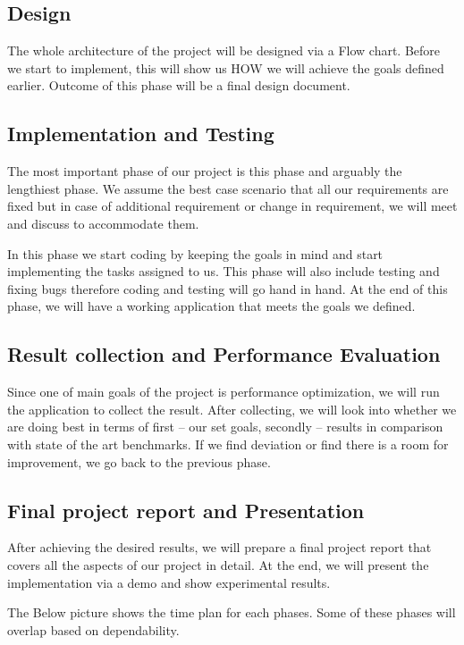 \documentclass[titlepage]{report}
\begin{document}
\subsection{Design}
The whole architecture of the project will be designed via a Flow chart. Before we start to implement, this will show us HOW we will achieve the goals defined earlier. Outcome of this phase will be a final design document. 

\subsection{Implementation and Testing}
The most important phase of our project is this phase and arguably the lengthiest phase. We assume the best case scenario that all our requirements are fixed but in case of additional requirement or change in requirement, we will meet and discuss to accommodate them. 

In this phase we start coding by keeping the goals in mind and start implementing the tasks assigned to us. This phase will also include testing and fixing bugs therefore coding and testing will go hand in hand. At the end of this phase, we will have a working application that meets the goals we defined. 

\subsection{Result collection and Performance Evaluation}
Since one of main goals of the project is performance optimization, we will run the application to collect the result. After collecting, we will look into whether we are doing best in terms of first – our set goals, secondly – results in comparison with state of the art benchmarks. If we find deviation or find there is a room for improvement, we go back to the previous phase.

\subsection{Final project report and Presentation}
After achieving the desired results, we will prepare a final project report that covers all the aspects of our project in detail. At the end, we will present the implementation via a demo and show experimental results. 

The Below picture shows the time plan for each phases. Some of these phases will overlap based on dependability.
\end{document}
